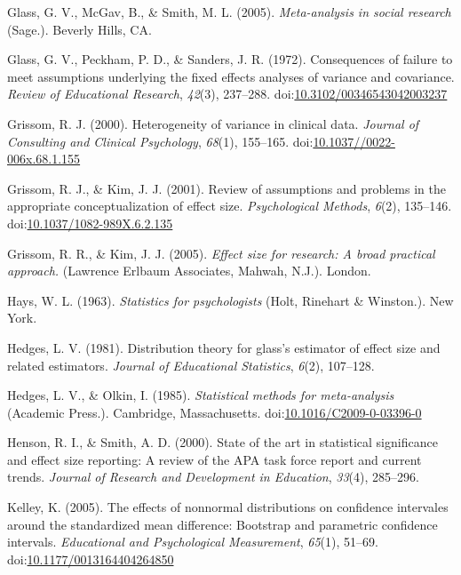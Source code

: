 \documentclass[
  man]{apa6}
\begin{document}
\leavevmode\hypertarget{ref-Glass_et_al_1981}{}%
Glass, G. V., McGav, B., \& Smith, M. L. (2005). \emph{Meta-analysis in social research} (Sage.). Beverly Hills, CA.

\leavevmode\hypertarget{ref-Glass_et_al_1972}{}%
Glass, G. V., Peckham, P. D., \& Sanders, J. R. (1972). Consequences of failure to meet assumptions underlying the fixed effects analyses of variance and covariance. \emph{Review of Educational Research}, \emph{42}(3), 237--288. doi:\href{https://doi.org/10.3102/00346543042003237}{10.3102/00346543042003237}

\leavevmode\hypertarget{ref-Grissom_2000}{}%
Grissom, R. J. (2000). Heterogeneity of variance in clinical data. \emph{Journal of Consulting and Clinical Psychology}, \emph{68}(1), 155--165. doi:\href{https://doi.org/10.1037//0022-006x.68.1.155}{10.1037//0022-006x.68.1.155}

\leavevmode\hypertarget{ref-Grissom_Kim_2001}{}%
Grissom, R. J., \& Kim, J. J. (2001). Review of assumptions and problems in the appropriate conceptualization of effect size. \emph{Psychological Methods}, \emph{6}(2), 135--146. doi:\href{https://doi.org/10.1037/1082-989X.6.2.135}{10.1037/1082-989X.6.2.135}

\leavevmode\hypertarget{ref-Grissom_and_kim_2005}{}%
Grissom, R. R., \& Kim, J. J. (2005). \emph{Effect size for research: A broad practical approach.} (Lawrence Erlbaum Associates, Mahwah, N.J.). London.

\leavevmode\hypertarget{ref-Hays_1963}{}%
Hays, W. L. (1963). \emph{Statistics for psychologists} (Holt, Rinehart \& Winston.). New York.

\leavevmode\hypertarget{ref-Hedges_1981}{}%
Hedges, L. V. (1981). Distribution theory for glass's estimator of effect size and related estimators. \emph{Journal of Educational Statistics}, \emph{6}(2), 107--128.

\leavevmode\hypertarget{ref-Hedges_Olkin_1985}{}%
Hedges, L. V., \& Olkin, I. (1985). \emph{Statistical methods for meta-analysis} (Academic Press.). Cambridge, Massachusetts. doi:\href{https://doi.org/10.1016/C2009-0-03396-0}{10.1016/C2009-0-03396-0}

\leavevmode\hypertarget{ref-Henson_Smith_2000}{}%
Henson, R. I., \& Smith, A. D. (2000). State of the art in statistical significance and effect size reporting: A review of the APA task force report and current trends. \emph{Journal of Research and Development in Education}, \emph{33}(4), 285--296.

\leavevmode\hypertarget{ref-Kelley_2005}{}%
Kelley, K. (2005). The effects of nonnormal distributions on confidence intervales around the standardized mean difference: Bootstrap and parametric confidence intervals. \emph{Educational and Psychological Measurement}, \emph{65}(1), 51--69. doi:\href{https://doi.org/10.1177/0013164404264850}{10.1177/0013164404264850}
\end{document}
